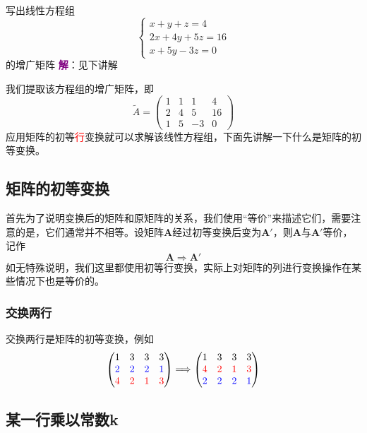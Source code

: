 \begin{example}
	写出线性方程组$$\left\{\begin{matrix} 
		x+y+z=4 \\  
		2x+4y+5z=16 \\
		x+5y-3z=0
	\end{matrix}\right. $$的增广矩阵
	\tcblower
	\textcolor{purple}{\textbf{解}}：见下讲解
\end{example}

我们提取该方程组的增广矩阵，即$$\tilde{A}=\begin{pmatrix}
	1 & 1 & 1 & 4\\
	2 & 4 & 5 & 16\\
	1 & 5 & -3 & 0
\end{pmatrix}$$应用矩阵的初等\textcolor{red}{行}变换就可以求解该线性方程组，下面先讲解一下什么是矩阵的初等变换。

\subsection{矩阵的初等变换}

首先为了说明变换后的矩阵和原矩阵的关系，我们使用``等价''来描述它们，需要注意的是，它们通常并不相等。设矩阵$\mathbf{A}$经过初等变换后变为$\mathbf{A}'$，则$\mathbf{A}$与$\mathbf{A}'$等价，记作$$\mathbf{A}\Longrightarrow  \mathbf{A}'$$如无特殊说明，我们这里都使用初等行变换，实际上对矩阵的列进行变换操作在某些情况下也是等价的。

\subsubsection{交换两行}

交换两行是矩阵的初等变换，例如$$\begin{pmatrix}
	1 & 3 & 3 & 3\\
\textcolor{blue}{2} & \textcolor{blue}{2} & \textcolor{blue}{2} & \textcolor{blue}{1}\\
	\textcolor{red}{4} & \textcolor{red}{2} & \textcolor{red}{1} & \textcolor{red}{3}
\end{pmatrix}\Longrightarrow \begin{pmatrix}
	1 & 3 & 3 & 3\\
	\textcolor{red}{4} & \textcolor{red}{2} & \textcolor{red}{1} & \textcolor{red}{3}\\
	\textcolor{blue}{2} & \textcolor{blue}{2} & \textcolor{blue}{2} & \textcolor{blue}{1}
\end{pmatrix}$$

\subsection{某一行乘以常数k}

